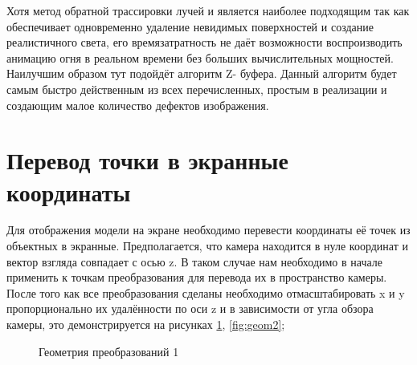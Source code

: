 \documentclass[a4paper,14pt]{report}
\begin{document}
  Хотя метод обратной трассировки лучей и является наиболее подходящим так как обеспечивает одновременно удаление невидимых поверхностей и создание реалистичного света, его времязатратность не даёт возможности воспроизводить анимацию огня в реальном времени без больших вычислительных мощностей. Наилучшим образом тут подойдёт алгоритм Z- буфера. Данный алгоритм будет самым быстро действенным из всех перечисленных, простым в реализации и создающим малое количество дефектов изображения.

\section{Перевод точки в экранные координаты}
Для отображения модели на экране необходимо перевести координаты её точек из объектных в экранные.
Предполагается, что камера находится в нуле координат и вектор взгляда совпадает с осью z. 
В таком случае нам необходимо в начале применить к точкам преобразования для перевода их в пространство камеры.
После того как все преобразования сделаны необходимо отмасштабировать x и y пропорционально их удалённости по оси z и в зависимости от угла обзора камеры, это демонстрируется на рисунках \ref{fig:geom1}, \ref{fig:geom2}; 
\begin{figure}[H]
 \caption{Геометрия преобразований 1}
 \label{fig:geom1}
\end{figure}
\end{document}
